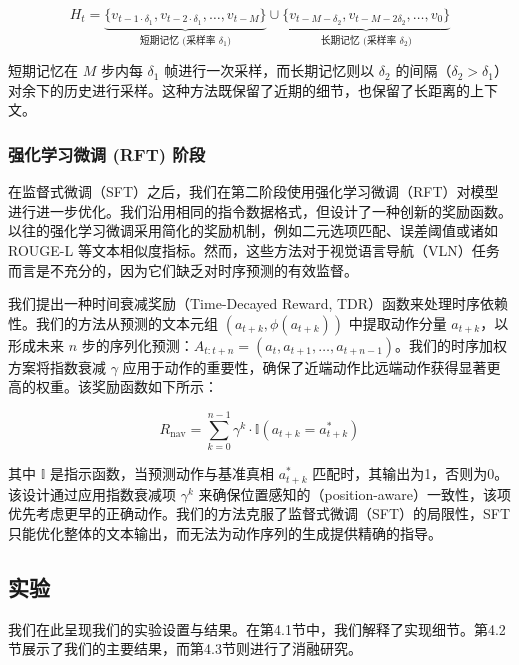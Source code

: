 \begin{equation}
H_t = \underbrace{\{v_{t-1 \cdot \delta_1}, v_{t-2 \cdot \delta_1}, \dots, v_{t-M}\}}_{\text{短期记忆 (采样率 } \delta_1 \text{)}} \cup \underbrace{\{v_{t-M-\delta_2}, v_{t-M-2\delta_2}, \dots, v_0\}}_{\text{长期记忆 (采样率 } \delta_2 \text{)}}
\end{equation}

短期记忆在 $ M $ 步内每 $ \delta_1 $ 帧进行一次采样，而长期记忆则以 $ \delta_2 $ 的间隔（$ \delta_2 > \delta_1 $）对余下的历史进行采样。这种方法既保留了近期的细节，也保留了长距离的上下文。



\subsubsection{强化学习微调 (RFT) 阶段}

在监督式微调（SFT）之后，我们在第二阶段使用强化学习微调（RFT）对模型进行进一步优化。我们沿用相同的指令数据格式，但设计了一种创新的奖励函数。以往的强化学习微调采用简化的奖励机制，例如二元选项匹配、误差阈值或诸如 ROUGE-L 等文本相似度指标。然而，这些方法对于视觉语言导航（VLN）任务而言是不充分的，因为它们缺乏对时序预测的有效监督。

我们提出一种时间衰减奖励（Time-Decayed Reward, TDR）函数来处理时序依赖性。我们的方法从预测的文本元组 $ (a_{t+k}, \phi(a_{t+k})) $ 中提取动作分量 $ a_{t+k} $，以形成未来 $ n $ 步的序列化预测：$ A_{t:t+n} = (a_t, a_{t+1}, \dots, a_{t+n-1}) $。我们的时序加权方案将指数衰减 $ \gamma $ 应用于动作的重要性，确保了近端动作比远端动作获得显著更高的权重。该奖励函数如下所示：

\begin{equation}
R_{\text{nav}} = \sum_{k=0}^{n-1} \gamma^k \cdot \mathbb{I}(a_{t+k} = a_{t+k}^*)
\end{equation}

其中 $ \mathbb{I} $ 是指示函数，当预测动作与基准真相 $ a_{t+k}^* $ 匹配时，其输出为1，否则为0。该设计通过应用指数衰减项 $ \gamma^k $ 来确保位置感知的（position-aware）一致性，该项优先考虑更早的正确动作。我们的方法克服了监督式微调（SFT）的局限性，SFT只能优化整体的文本输出，而无法为动作序列的生成提供精确的指导。

\subsection{ 实验}

我们在此呈现我们的实验设置与结果。在第4.1节中，我们解释了实现细节。第4.2节展示了我们的主要结果，而第4.3节则进行了消融研究。

